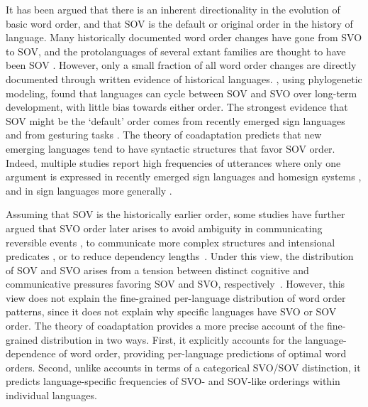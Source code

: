 \documentclass[9pt,twocolumn,twoside,lineno]{pnas-new}
\begin{document}
It has been argued that there is an inherent directionality in the evolution of basic word order, and that SOV is the default or original order in the history of language.
Many historically documented word order changes have gone from SVO to SOV, and the protolanguages of several extant families are thought to have been SOV \citep{givon1979understanding, newmeyer2000evolutionary, maurits2014tracing}.
However, only a small fraction of all word order changes are directly documented through written evidence of historical languages. \cite{maurits2014tracing}, using phylogenetic modeling, found that languages can cycle between SOV and SVO over long-term development, with little bias towards either order.
The strongest evidence that SOV might be the `default' order comes from recently emerged sign languages \citep{senghas1997argument, sandler2005emergence, goldin-meadow1998spontaneous, meir2010emerging} and from gesturing tasks \citep{goldin-meadow2008natural, langus2010cognitive}.
The theory of coadaptation predicts that new emerging languages tend to have syntactic structures that favor SOV order.
Indeed, multiple studies report high frequencies of utterances where only one argument is expressed in recently emerged sign languages and homesign systems \citep{sandler2005emergence, goldin-meadow1998spontaneous, neveu2016sign, ergin2018development}, and in sign languages more generally \citep{napoli2014order}.


Assuming that SOV is the historically earlier order, some studies have further argued that SVO order later arises to avoid ambiguity in communicating reversible events \citep{gibson-noisy-channel-2013, hall2013cognitive}, to communicate more complex structures \citep{langus2010cognitive, marno2015a, ferrer-i-cancho-placement-2017} and intensional predicates \citep{schouwstra-semantic-2011,napoli2017influence}, or to reduce dependency lengths~\citep{ferrer-i-cancho-placement-2017}.
Under this view, the distribution of SOV and SVO arises from a tension between distinct cognitive and communicative pressures favoring SOV and SVO, respectively~\citep{langus2010cognitive}.
However, this view does not explain the fine-grained per-language distribution of word order patterns, since it does not explain why specific languages have SVO or SOV order.
The theory of coadaptation provides a more precise account of the fine-grained distribution in two ways. First, it explicitly accounts for the language-dependence of word order, providing per-language predictions of optimal word orders.
Second, unlike accounts in terms of a categorical SVO/SOV distinction, it predicts language-specific frequencies of SVO- and SOV-like orderings within individual languages.
\end{document}
